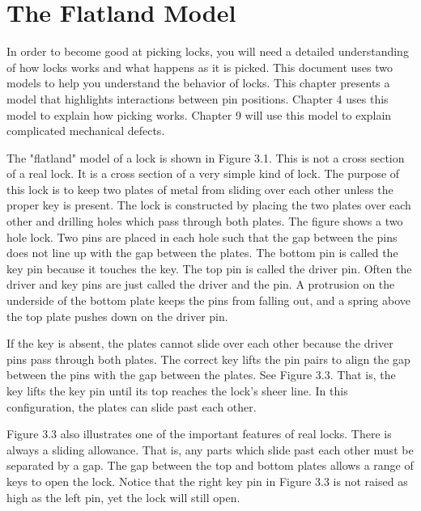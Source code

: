 \chapter{The Flatland Model}
In order to become good at picking locks, you will need a detailed understanding of how
locks works and what happens as it is picked. This document uses two models to help you
understand the behavior of locks. This chapter presents a model that highlights interactions
between pin positions. Chapter 4 uses this model to explain how picking works. Chapter 9
will use this model to explain complicated mechanical defects.

The "flatland" model of a lock is shown in Figure 3.1. This is not a cross section of a
real lock. It is a cross section of a very simple kind of lock. The purpose of this lock is to
keep two plates of metal from sliding over each other unless the proper key is present. The
lock is constructed by placing the two plates over each other and drilling holes which pass
through both plates. The figure shows a two hole lock. Two pins are placed in each hole
such that the gap between the pins does not line up with the gap between the plates. The
bottom pin is called the key pin because it touches the key. The top pin is called the driver
pin. Often the driver and key pins are just called the driver and the pin. A protrusion on
the underside of the bottom plate keeps the pins from falling out, and a spring above the
top plate pushes down on the driver pin.

If the key is absent, the plates cannot slide over each other because the driver pins pass
through both plates. The correct key lifts the pin pairs to align the gap between the pins
with the gap between the plates. See Figure 3.3. That is, the key lifts the key pin until its
top reaches the lock's sheer line. In this configuration, the plates can slide past each other.

Figure 3.3 also illustrates one of the important features of real locks. There is always a
sliding allowance. That is, any parts which slide past each other must be separated by a
gap. The gap between the top and bottom plates allows a range of keys to open the lock.
Notice that the right key pin in Figure 3.3 is not raised as high as the left pin, yet the lock
will still open.
